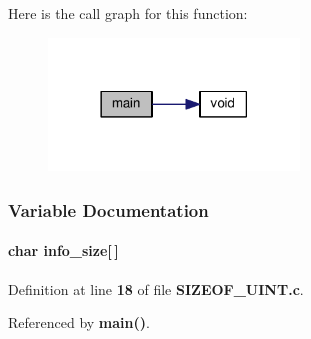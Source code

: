 Here is the call graph for this function\+:
\nopagebreak
\begin{figure}[H]
\begin{center}
\leavevmode
\includegraphics[width=189pt]{d3/d8a/SIZEOF__UINT_8c_a0ddf1224851353fc92bfbff6f499fa97_cgraph}
\end{center}
\end{figure}




\subsubsection{Variable Documentation}
\paragraph[{info\+\_\+size}]{\setlength{\rightskip}{0pt plus 5cm}char info\+\_\+size[$\,$]}\label{SIZEOF__UINT_8c_a0355ddcca1b74f883f20cc208db8790b}


Definition at line {\bf 18} of file {\bf S\+I\+Z\+E\+O\+F\+\_\+\+U\+I\+N\+T.\+c}.



Referenced by {\bf main()}.

